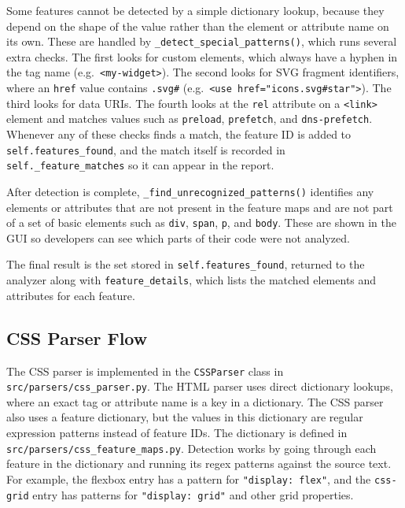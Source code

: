 Some features cannot be detected by a simple dictionary lookup, because they depend on the shape of the value rather than the element or attribute name on its own. These are handled by \texttt{\_detect\_special\_patterns()}, which runs several extra checks. The first looks for custom elements, which always have a hyphen in the tag name (e.g.\ \texttt{<my-widget>}). The second looks for SVG fragment identifiers, where an \texttt{href} value contains \texttt{.svg\#} (e.g.\ \texttt{<use href="icons.svg\#star">}). The third looks for data URIs. The fourth looks at the \texttt{rel} attribute on a \texttt{<link>} element and matches values such as \texttt{preload}, \texttt{prefetch}, and \texttt{dns-prefetch}. Whenever any of these checks finds a match, the feature ID is added to \texttt{self.features\_found}, and the match itself is recorded in \texttt{self.\_feature\_matches} so it can appear in the report.

After detection is complete, \texttt{\_find\_unrecognized\_patterns()} identifies any elements or attributes that are not present in the feature maps and are not part of a set of basic elements such as \texttt{div}, \texttt{span}, \texttt{p}, and \texttt{body}. These are shown in the GUI so developers can see which parts of their code were not analyzed.

The final result is the set stored in \texttt{self.features\_found}, returned to the analyzer along with \texttt{feature\_details}, which lists the matched elements and attributes for each feature.

\subsection{CSS Parser Flow}

The CSS parser is implemented in the \texttt{CSSParser} class in \texttt{src/parsers/css\_parser.py}. The HTML parser uses direct dictionary lookups, where an exact tag or attribute name is a key in a dictionary. The CSS parser also uses a feature dictionary, but the values in this dictionary are regular expression patterns instead of feature IDs. The dictionary is defined in \texttt{src/parsers/css\_feature\_maps.py}. Detection works by going through each feature in the dictionary and running its regex patterns against the source text. For example, the flexbox entry has a pattern for \texttt{"display: flex"}, and the \texttt{css-grid} entry has patterns for \texttt{"display: grid"} and other grid properties.

